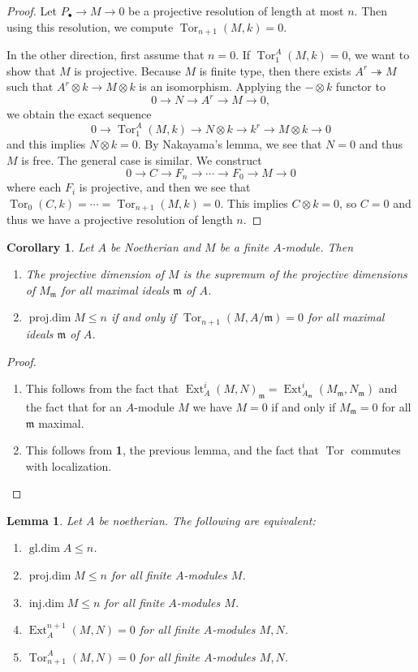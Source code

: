 \documentclass[leqno, openany]{memoir}
\newtheorem{cor}[thm]{Corollary}
\newtheorem{lem}[thm]{Lemma}
\theoremstyle{definition}
\theoremstyle{remark}
\theoremstyle{plain}
\theoremstyle{definition}
\theoremstyle{remark}
\newcommand{\mf}[1]{\mathfrak{#1}}
\DeclareMathOperator{\Ext}{Ext}
\DeclareMathOperator{\Tor}{Tor}
\DeclareMathOperator{\pdim}{proj.dim}
\DeclareMathOperator{\idim}{inj.dim}
\DeclareMathOperator{\gdim}{gl.dim}
\begin{document}
\begin{proof} Let $P_{\bullet} \to M \to 0$ be a projective resolution of
    length at most $n$. Then using this resolution, we compute $\Tor_{n+1}(M,k)
    = 0$. 

    In the other direction, first assume that $n=0$. If $\Tor_1^A(M,k) = 0$, we
    want to show that $M$ is projective. Because $M$ is finite type, then there
    exists $A^r \twoheadrightarrow M$ such that $A^r \otimes k \to M \otimes k$
    is an isomorphism. Applying the $- \otimes k$ functor to \[ 0 \to N \to A^r
    \to M \to 0, \] we obtain the exact sequence \[ 0 \to \Tor_1^A(M,k) \to N
\otimes k \to k^r \to M \otimes k \to 0 \] and this implies $N \otimes k = 0$.
By Nakayama's lemma, we see that $N = 0$ and thus $M$ is free. The general case
is similar. We construct \[ 0 \to C \to F_n \to \cdots \to F_0 \to M \to 0 \]
where each $F_i$ is projective, and then we see that $\Tor_0(C,k) = \cdots =
\Tor_{n+1}(M,k) = 0$. This implies $C \otimes k = 0$, so $C = 0$ and thus we
have a projective resolution of length $n$.  \end{proof}

\begin{cor} Let $A$ be Noetherian and $M$ be a finite $A$-module. Then
    \begin{enumerate} \item The projective dimension of $M$ is the supremum of
        the projective dimensions of $M_{\mf{m}}$ for all maximal ideals
        $\mf{m}$ of $A$.  \item $\pdim M \leq n$ if and only if $\Tor_{n+1}(M,
        A/\mf{m}) = 0$ for all maximal ideals $\mf{m}$ of $A$.  \end{enumerate}
    \end{cor}

\begin{proof} \begin{enumerate} \item This follows from the fact that
    $\Ext_A^i(M,N)_{\mf{m}} = \Ext_{A_{\mf{m}}}^i(M_{\mf{m}}, N_{\mf{m}})$ and
    the fact that for an $A$-module $M$ we have $M = 0$ if and only if
    $M_{\mf{m}} = 0$ for all $\mf{m}$ maximal.  \item This follows from
    \textbf{1}, the previous lemma, and the fact that $\Tor$ commutes with
    localization. \qedhere \end{enumerate} \end{proof}

\begin{lem} Let $A$ be noetherian. The following are equivalent:
    \begin{enumerate} \item $\gdim A \leq n$.  \item $\pdim M \leq n$ for all
        finite $A$-modules $M$.  \item $\idim M \leq n$ for all finite
        $A$-modules $M$.  \item $\Ext_A^{n+1}(M,N) = 0$ for all finite
        $A$-modules $M,N$.  \item $\Tor_{n+1}^A(M, N) = 0$ for all finite
$A$-modules $M,N$.  \end{enumerate} \end{lem}
\end{document}
